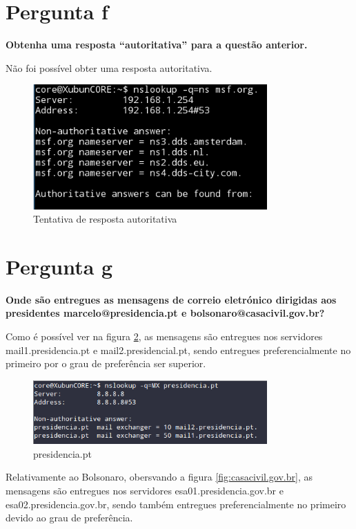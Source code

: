 \documentclass[a4paper]{report}
\begin{document}
\section{Pergunta f}
\textbf{Obtenha uma resposta “autoritativa” para a questão anterior.}

Não foi possível obter uma resposta autoritativa.

\begin{figure}[H]
    \centering 
    \includegraphics[width=0.8\textwidth]{images/autoritativa.png}  
    \caption{Tentativa de resposta autoritativa}
    \label{fig:autoritativa}
\end{figure}

\section{Pergunta g}
\textbf{Onde são entregues as mensagens de correio eletrónico dirigidas aos
presidentes marcelo@presidencia.pt e bolsonaro@casacivil.gov.br?}

Como é possível ver na figura \ref{fig:presidencia.pt}, as mensagens são
entregues nos servidores mail1.presidencia.pt e mail2.presidencial.pt, 
sendo entregues preferencialmente no primeiro por o grau de preferência
ser superior.

\begin{figure}[H]
    \centering 
    \includegraphics[width=0.8\textwidth]{images/presidencia_pt.png}  
    \caption{presidencia.pt}
    \label{fig:presidencia.pt}
\end{figure}

Relativamente ao Bolsonaro, obersvando a figura \ref{fig:casacivil.gov.br},
as mensagens são entregues nos servidores esa01.presidencia.gov.br e 
esa02.presidencia.gov.br, sendo também entregues preferencialmente no primeiro
devido ao grau de preferência.
\end{document}
